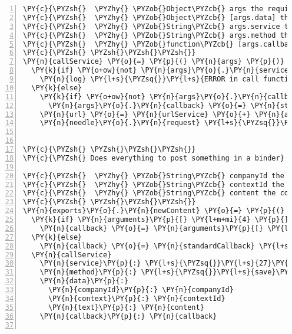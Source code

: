 \begin{Verbatim}[fontsize=\scriptsize,commandchars=\\\{\},numbers=left,firstnumber=1,stepnumber=1]
\PY{c}{\PYZsh{}  \PYZhy{} \PYZob{}Object\PYZcb{} args the required function arguments object}
\PY{c}{\PYZsh{}  \PYZhy{} \PYZob{}Object\PYZcb{} [args.data] the data to be posted}
\PY{c}{\PYZsh{}  \PYZhy{} \PYZob{}String\PYZcb{} args.service the required service identifier to be appended to the url}
\PY{c}{\PYZsh{}  \PYZhy{} \PYZob{}String\PYZcb{} args.method the required method identifier to be appended to the url}
\PY{c}{\PYZsh{}  \PYZhy{} \PYZob{}function\PYZcb{} [args.callback] the function to receive the request answer}
\PY{c}{\PYZsh{} \PYZsh{}\PYZsh{}\PYZsh{}}
\PY{n}{callService} \PY{o}{=} \PY{p}{(} \PY{n}{args} \PY{p}{)} \PY{o}{\PYZhy{}}\PY{o}{\PYZgt{}}
  \PY{k}{if} \PY{o+ow}{not} \PY{n}{args}\PY{o}{.}\PY{n}{service} \PY{o+ow}{or} \PY{o+ow}{not} \PY{n}{args}\PY{o}{.}\PY{n}{method}
    \PY{n}{log} \PY{l+s}{\PYZsq{}}\PY{l+s}{ERROR in call function: Missing arguments!}\PY{l+s}{\PYZsq{}}
  \PY{k}{else}
    \PY{k}{if} \PY{o+ow}{not} \PY{n}{args}\PY{o}{.}\PY{n}{callback}
      \PY{n}{args}\PY{o}{.}\PY{n}{callback} \PY{o}{=} \PY{n}{standardCallback} \PY{l+s}{\PYZsq{}}\PY{l+s}{call}\PY{l+s}{\PYZsq{}}
    \PY{n}{url} \PY{o}{=} \PY{n}{urlService} \PY{o}{+} \PY{n}{args}\PY{o}{.}\PY{n}{service} \PY{o}{+} \PY{l+s}{\PYZsq{}}\PY{l+s}{/}\PY{l+s}{\PYZsq{}} \PY{o}{+} \PY{n}{args}\PY{o}{.}\PY{n}{method}
    \PY{n}{needle}\PY{o}{.}\PY{n}{request} \PY{l+s}{\PYZsq{}}\PY{l+s}{post}\PY{l+s}{\PYZsq{}}\PY{p}{,} \PY{n}{url}\PY{p}{,} \PY{n}{args}\PY{o}{.}\PY{n}{data}\PY{p}{,} \PY{n}{credentials}\PY{p}{,} \PY{n}{args}\PY{o}{.}\PY{n}{callback}


\PY{c}{\PYZsh{} \PYZsh{}\PYZsh{}\PYZsh{}}
\PY{c}{\PYZsh{} Does everything to post something in a binder}

\PY{c}{\PYZsh{}  \PYZhy{} \PYZob{}String\PYZcb{} companyId the comany associated to the binder}
\PY{c}{\PYZsh{}  \PYZhy{} \PYZob{}String\PYZcb{} contextId the binder id}
\PY{c}{\PYZsh{}  \PYZhy{} \PYZob{}String\PYZcb{} content the content to be posted}
\PY{c}{\PYZsh{} \PYZsh{}\PYZsh{}\PYZsh{}}
\PY{n}{exports}\PY{o}{.}\PY{n}{newContent} \PY{o}{=} \PY{p}{(} \PY{n}{companyId}\PY{p}{,} \PY{n}{contextId}\PY{p}{,} \PY{n}{content} \PY{p}{)} \PY{o}{\PYZhy{}}\PY{o}{\PYZgt{}}
  \PY{k}{if} \PY{n}{arguments}\PY{p}{[} \PY{l+m+mi}{4} \PY{p}{]}
    \PY{n}{callback} \PY{o}{=} \PY{n}{arguments}\PY{p}{[} \PY{l+m+mi}{4} \PY{p}{]}
  \PY{k}{else}
    \PY{n}{callback} \PY{o}{=} \PY{n}{standardCallback} \PY{l+s}{\PYZsq{}}\PY{l+s}{newContent}\PY{l+s}{\PYZsq{}}
  \PY{n}{callService}
    \PY{n}{service}\PY{p}{:} \PY{l+s}{\PYZsq{}}\PY{l+s}{27}\PY{l+s}{\PYZsq{}}
    \PY{n}{method}\PY{p}{:} \PY{l+s}{\PYZsq{}}\PY{l+s}{save}\PY{l+s}{\PYZsq{}}
    \PY{n}{data}\PY{p}{:}
      \PY{n}{companyId}\PY{p}{:} \PY{n}{companyId}
      \PY{n}{context}\PY{p}{:} \PY{n}{contextId}
      \PY{n}{text}\PY{p}{:} \PY{n}{content}
    \PY{n}{callback}\PY{p}{:} \PY{n}{callback}


\end{Verbatim}
